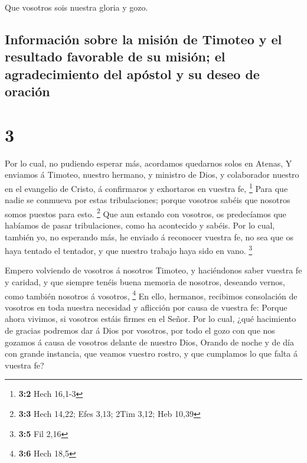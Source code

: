  Que vosotros sois nuestra gloria y gozo.

\hypertarget{informaciuxf3n-sobre-la-misiuxf3n-de-timoteo-y-el-resultado-favorable-de-su-misiuxf3n-el-agradecimiento-del-apuxf3stol-y-su-deseo-de-oraciuxf3n}{%
\subsection{Información sobre la misión de Timoteo y el resultado
favorable de su misión; el agradecimiento del apóstol y su deseo de
oración}\label{informaciuxf3n-sobre-la-misiuxf3n-de-timoteo-y-el-resultado-favorable-de-su-misiuxf3n-el-agradecimiento-del-apuxf3stol-y-su-deseo-de-oraciuxf3n}}

\hypertarget{section-2}{%
\section{3}\label{section-2}}

 Por lo cual, no pudiendo esperar más, acordamos quedarnos
solos en Atenas,  Y enviamos á Timoteo, nuestro hermano, y
ministro de Dios, y colaborador nuestro en el evangelio de Cristo, á
confirmaros y exhortaros en vuestra fe, \footnote{\textbf{3:2} Hech
  16,1-3}  Para que nadie se conmueva por estas
tribulaciones; porque vosotros sabéis que nosotros somos puestos para
esto. \footnote{\textbf{3:3} Hech 14,22; Efes 3,13; 2Tim 3,12; Heb 10,39}
 Que aun estando con vosotros, os predecíamos que habíamos
de pasar tribulaciones, como ha acontecido y sabéis.  Por lo
cual, también yo, no esperando más, he enviado á reconocer vuestra fe,
no sea que os haya tentado el tentador, y que nuestro trabajo haya sido
en vano. \footnote{\textbf{3:5} Fil 2,16}

 Empero volviendo de vosotros á nosotros Timoteo, y
haciéndonos saber vuestra fe y caridad, y que siempre tenéis buena
memoria de nosotros, deseando vernos, como también nosotros á vosotros,
\footnote{\textbf{3:6} Hech 18,5}  En ello, hermanos,
recibimos consolación de vosotros en toda nuestra necesidad y aflicción
por causa de vuestra fe:  Porque ahora vivimos, si vosotros
estáis firmes en el Señor.  Por lo cual, ¿qué hacimiento de
gracias podremos dar á Dios por vosotros, por todo el gozo con que nos
gozamos á causa de vosotros delante de nuestro Dios, 
Orando de noche y de día con grande instancia, que veamos vuestro
rostro, y que cumplamos lo que falta á vuestra fe?

